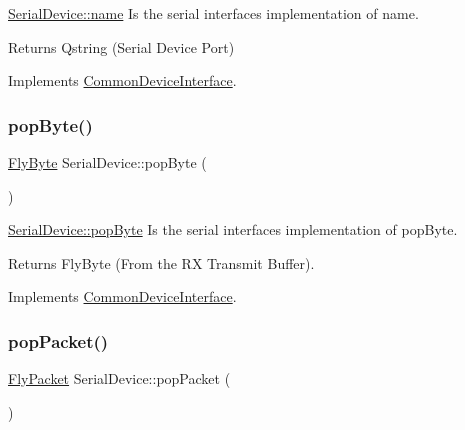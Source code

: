 \hyperlink{class_serial_device_a97092ec9379ed561866dad21475ea331}{Serial\+Device\+::name} Is the serial interface\textquotesingle{}s implementation of name. 

\begin{DoxyReturn}{Returns}
Qstring (Serial Device Port) 
\end{DoxyReturn}


Implements \hyperlink{class_common_device_interface_a3d80b22eafc88af3109b08491bef6e8a}{Common\+Device\+Interface}.

\hypertarget{class_serial_device_aa48df17f28ab9f613ba07181487a39c9}{}\label{class_serial_device_aa48df17f28ab9f613ba07181487a39c9} 
\subsubsection{\texorpdfstring{pop\+Byte()}{popByte()}}
{\footnotesize\ttfamily \hyperlink{conversions_8h_a1f006e31a957accfe6aa1bf6f401efce}{Fly\+Byte} Serial\+Device\+::pop\+Byte (\begin{DoxyParamCaption}{ }\end{DoxyParamCaption})\hspace{0.3cm}{\ttfamily [virtual]}}



\hyperlink{class_serial_device_aa48df17f28ab9f613ba07181487a39c9}{Serial\+Device\+::pop\+Byte} Is the serial interface\textquotesingle{}s implementation of pop\+Byte. 

\begin{DoxyReturn}{Returns}
Fly\+Byte (From the RX Transmit Buffer). 
\end{DoxyReturn}


Implements \hyperlink{class_common_device_interface_ab9f57b21f72ebfbf79c86f8d0e4f0654}{Common\+Device\+Interface}.

\hypertarget{class_serial_device_ac581710eb5e03945d9b3de9d39be51fc}{}\label{class_serial_device_ac581710eb5e03945d9b3de9d39be51fc} 
\subsubsection{\texorpdfstring{pop\+Packet()}{popPacket()}}
{\footnotesize\ttfamily \hyperlink{class_fly_packet}{Fly\+Packet} Serial\+Device\+::pop\+Packet (\begin{DoxyParamCaption}{ }\end{DoxyParamCaption})\hspace{0.3cm}{\ttfamily [virtual]}}



